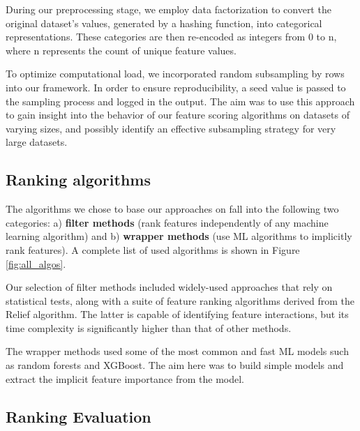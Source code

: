 \documentclass[fleqn,moreauthors,10pt]{ds_report}
\begin{document}

During our preprocessing stage, we employ data factorization to convert the original dataset's values, generated by a hashing function, into categorical representations. These categories are then re-encoded as integers from 0 to n, where n represents the count of unique feature values.

To optimize computational load, we incorporated random subsampling by rows into our framework. In order to ensure reproducibility, a seed value is passed to the sampling process and logged in the output. The aim was to use this approach to gain insight into the behavior of our feature scoring algorithms on datasets of varying sizes, and possibly identify an effective subsampling strategy for very large datasets.

\subsection*{Ranking algorithms}

The algorithms we chose to base our approaches on fall into the following two categories: a) \textbf{filter methods} (rank features independently of any machine learning algorithm) and b) \textbf{wrapper methods} (use ML algorithms to implicitly rank features). A complete list of used algorithms is shown in Figure \ref{fig:all_algos}.

Our selection of filter methods included widely-used approaches that rely on statistical tests, along with a suite of feature ranking algorithms derived from the Relief algorithm. The latter is capable of identifying feature interactions, but its time complexity is significantly higher than that of other methods.

The wrapper methods used some of the most common and fast ML models such as random forests and XGBoost. The aim here was to build simple models and extract the implicit feature importance from the model.


\subsection*{Ranking Evaluation}
\end{document}
